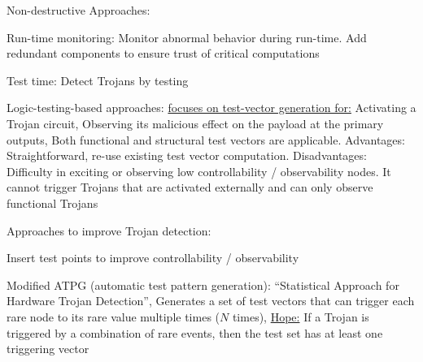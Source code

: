 \documentclass[landscape, a4paper]{article}
\begin{document}
\begin{minipage}[t]{0.2\linewidth}
\begin{betterlist}
\begin{betterlist}
\begin{betterlist}
				\item \alert{Non-destructive Approaches:}
				\begin{betterlist}
					\item \alert{Run-time monitoring:} Monitor abnormal behavior during run-time. Add redundant components to ensure trust of critical computations
					\item \alert{Test time:} Detect Trojans by testing
					\begin{betterlist}
						\item \alert{Logic-testing-based approaches:} \underline{focuses on test-vector generation for:} Activating a Trojan circuit, Observing its malicious effect on the payload at the primary outputs, Both functional and structural test vectors are applicable. \alert{Advantages:} Straightforward, re-use existing test vector computation. \alert{Disadvantages:} Difficulty in exciting or observing low controllability / observability nodes. It cannot trigger Trojans that are activated externally and can only observe functional Trojans
						\begin{betterlist}
							\item Approaches to improve Trojan detection:
							\item Insert \alert{test points} to improve controllability / observability
							\item \alert{Modified ATPG} (automatic test pattern generation): \enquote{Statistical Approach for Hardware Trojan Detection}, Generates a set of test vectors that can trigger each rare node to its rare value multiple times ($N$ times), \underline{Hope:} If a Trojan is triggered by a combination of rare events, then the test set has at least one triggering vector%
						\end{betterlist}
					\end{betterlist}
				\end{betterlist}
			\end{betterlist}
		\end{betterlist}
	\end{betterlist}
\end{minipage}
\end{document}
